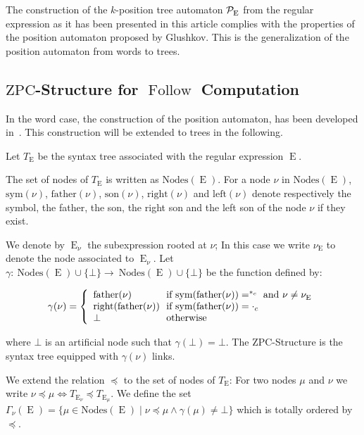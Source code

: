 \documentclass{llncs}
\DeclareMathOperator{\Follow}{Follow}
\DeclareMathOperator{\E}{E}
\begin{document}
The construction of the $k$-position tree automaton ${\cal P}_{\E}$ from the regular expression  as it has been presented in this article complies with the properties of the position automaton proposed by Glushkov. 
This is the generalization of the position automaton from words to trees.

\subsection{$\mathrm{ZPC}$-Structure for $\Follow$ Computation}
In the word case, the construction of the position automaton, has been developed in~\cite{ZPC96,ZPC}. This construction will be extended to trees in the following.
 
Let $T_{\E}$ be the syntax tree associated with the regular expression  $\E$. 

The set of nodes of $T_{\E}$ is written as $\mathrm{Nodes}(\E)$. For a node $\nu$ in $\mathrm{Nodes}(\E)$, $\mathrm{sym}(\nu)$, $\mathrm{father}(\nu)$, $\mathrm{son}(\nu)$, $\mathrm{right}(\nu)$ and $\mathrm{left}(\nu)$ denote respectively the symbol, the father, the son, the right son and the left son of the node $\nu$ if they exist. 

We denote by $\E_{\nu}$ the subexpression rooted at $\nu$; In this case we write $\nu_{\E}$ to denote the node associated to $\E_{\nu}$. Let $\gamma:~\mathrm{Nodes}(\E)\cup\{\bot\}\rightarrow ~\mathrm{Nodes}(\E)\cup\{\bot\}$ be the function defined by: 

 
    $$\gamma(\nu)= \left\{
    \begin{array}{l@{\ }l}
    \mathrm{father}(\nu) & \mbox{ if } \mathrm{sym}(\mathrm{father}(\nu))=^{*_c} \mbox{ and }\nu\neq \nu_{\E}\\
   \mathrm{right}(\mathrm{father}(\nu)) & \mbox{ if } \mathrm{sym}(\mathrm{father}(\nu))=\cdot_c\\
    \bot & \mbox{ otherwise }\\
    \end{array}\right.$$
    

\noindent where $\bot$ is an artificial node such that $\gamma(\bot)=\bot$. The $\mathrm{ZPC}$-Structure is the syntax tree equipped with $\gamma(\nu)$ links.

We extend the relation $\preccurlyeq$ to the set of nodes of $T_{\E}$: For two nodes $\mu$ and $\nu$ we write $\nu\preccurlyeq\mu\Leftrightarrow T_{\E_{\nu}}\preccurlyeq T_{\E_{\mu}}$. We define the set $\Gamma_{\nu}(\E)=\{\mu\in\mathrm{Nodes}(\E)\mid \nu \preccurlyeq \mu \land \gamma(\mu)\neq \bot\}$ which is totally ordered by $\preccurlyeq$.
\end{document}
